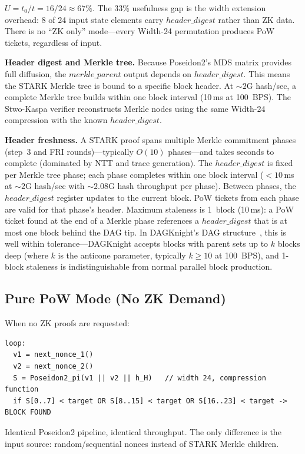 \documentclass[11pt,a4paper]{article}
\begin{document}
$U = t_0/t = 16/24 \approx 67\%$. The 33\% usefulness gap is the width extension overhead: 8 of 24 input state elements carry $\mathit{header\_digest}$ rather than ZK data. There is no ``ZK only'' mode---every Width-24 permutation produces PoW tickets, regardless of input.

\textbf{Header digest and Merkle tree.} Because Poseidon2's MDS matrix provides full diffusion, the $\mathit{merkle\_parent}$ output depends on $\mathit{header\_digest}$. This means the STARK Merkle tree is bound to a specific block header. At ${\sim}2$G hash/sec, a complete Merkle tree builds within one block interval (10\,ms at 100~BPS). The Stwo-Kaspa verifier reconstructs Merkle nodes using the same Width-24 compression with the known $\mathit{header\_digest}$.

\textbf{Header freshness.} A STARK proof spans multiple Merkle commitment phases (step~3 and FRI rounds)---typically $O(10)$ phases---and takes seconds to complete (dominated by NTT and trace generation). The $\mathit{header\_digest}$ is fixed per Merkle tree phase; each phase completes within one block interval ($<10$\,ms at ${\sim}2$G hash/sec with ${\sim}2.08$G hash throughput per phase). Between phases, the $\mathit{header\_digest}$ register updates to the current block. PoW tickets from each phase are valid for that phase's header. Maximum staleness is 1~block (10\,ms): a PoW ticket found at the end of a Merkle phase references a $\mathit{header\_digest}$ that is at most one block behind the DAG tip. In DAGKnight's DAG structure~\cite{dagknight}, this is well within tolerance---DAGKnight accepts blocks with parent sets up to $k$ blocks deep (where $k$ is the anticone parameter, typically $k \geq 10$ at 100~BPS), and 1-block staleness is indistinguishable from normal parallel block production.

\subsection{Pure PoW Mode (No ZK Demand)}
\label{sec:pure-pow}

When no ZK proofs are requested:
\begin{Verbatim}[fontsize=\small]
loop:
  v1 = next_nonce_1()
  v2 = next_nonce_2()
  S = Poseidon2_pi(v1 || v2 || h_H)   // width 24, compression function
  if S[0..7] < target OR S[8..15] < target OR S[16..23] < target -> BLOCK FOUND
\end{Verbatim}

Identical Poseidon2 pipeline, identical throughput. The only difference is the input source: random/sequential nonces instead of STARK Merkle children.
\end{document}

